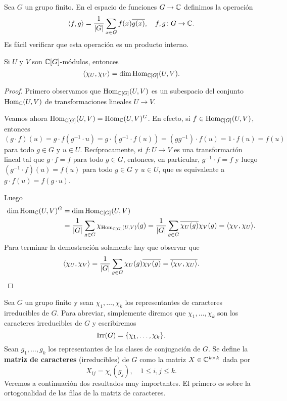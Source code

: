 Sea $G$ un grupo finito. En el espacio de funciones $G\to\mathbb{C}$ definimos la operación
\[
\langle f,g\rangle=\frac{1}{|G|}\sum_{x\in G}f(x)\overline{g(x)},
\quad f,g\colon G\to\mathbb{C}.
\]
Es fácil verificar que esta operación es un producto interno. 

\begin{theorem}
Si $U$ y $V$ son $\mathbb{C}[G]$-módulos, entonces 
\[
\langle\chi_U,\chi_V\rangle=\dim\operatorname{Hom}_{\mathbb{C}[G]}(U,V).
\]
\end{theorem}

\begin{proof}
    Primero observamos que $\operatorname{Hom}_{\mathbb{C}[G]}(U,V)$ es un subespacio del conjunto $\operatorname{Hom}_{\mathbb{C}}(U,V)$ de transformaciones lineales $U\to V$.
    
    Veamos ahora $\operatorname{Hom}_{\mathbb{C}[G]}(U,V)=\operatorname{Hom}_{\mathbb{C}}(U,V)^G$. En efecto, si $f\in\operatorname{Hom}_{\mathbb{C}[G]}(U,V)$, entonces
    \[
    (g\cdot f)(u)=g\cdot f(g^{-1}\cdot u)=g\cdot (g^{-1}\cdot f(u))=(gg^{-1})\cdot f(u)=1\cdot f(u)=f(u)
    \]
    para todo $g\in G$ y $u\in U$. Recíprocamente, si $f\colon U\to V$ es una transformación lineal tal que 
    $g\cdot f=f$ para todo $g\in G$, entonces, en particular, $g^{-1}\cdot f=f$ y luego
    $(g^{-1}\cdot f)(u)=f(u)$ para todo $g\in G$ y $u\in U$, que es equivalente a 
    $g\cdot f(u)=f(g\cdot u)$. 

    Luego
    \begin{align*}
    \dim\operatorname{Hom}_{\mathbb{C}}(U,V)^G
    &=\dim\operatorname{Hom}_{\mathbb{C}[G]}(U,V)\\
    &=\frac{1}{|G|}\sum_{g\in G}\chi_{\operatorname{Hom}_{\mathbb{C}[G]}(U,V)}(g)
    =\frac{1}{|G|}\sum_{g\in G}\overline{\chi_U(g)}\chi_V(g)
    =\langle\chi_V,\chi_U\rangle.
    \end{align*}
    Para terminar la demostración solamente hay que observar 
    que 
    \[
    \langle\chi_U,\chi_V\rangle=\frac{1}{|G|}\sum_{g\in G}\chi_U(g)\overline{\chi_V(g)}=\overline{\langle\chi_V,\chi_U\rangle}.\qedhere
    \]
\end{proof}

Sea $G$ un grupo finito y sean $\chi_1,\dots,\chi_k$ los representantes de
caracteres irreducibles de $G$. Para abreviar, simplemente diremos que
$\chi_1,\dots,\chi_k$ son los caracteres irreducibles de $G$ y escribiremos
\[
	\operatorname{Irr}(G)=\{\chi_1,\dots,\chi_k\}.
\]
Sean $g_1,\dots,g_k$ los representantes de las clases de
conjugación de $G$. Se define la \textbf{matriz de caracteres} (irreducibles) de $G$ como la
matriz $X\in\mathbb{C}^{k\times k}$ dada por
\[
X_{ij}=\chi_i(g_j),\quad
1\leq i,j\leq k.
\]
Veremos a continuación dos resultados muy importantes. El primero es
sobre la ortogonalidad de las filas de la matriz de caracteres. 

